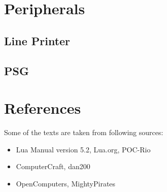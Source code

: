\documentclass[10pt, stock, openany]{memoir}
\let\oldsection\chapter
\renewcommand\chapter{\clearpage\oldsection}
\begin{document}
\part{Peripherals}

\chapter{Line Printer}


\chapter{PSG}
%



\part{References}

Some of the texts are taken from following sources:

\begin{itemize}
\item Lua Manual version 5.2, Lua.org, POC-Rio
\item ComputerCraft, dan200
\item OpenComputers, MightyPirates
\end{itemize}

\afterpage{\pagestyle{empty}\null\newpage}
\end{document}
